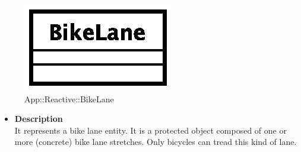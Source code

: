 \begin{figure}[h]
\centering
\includegraphics[scale=0.6,keepaspectratio]{images/solution/bike_lane.eps}
\caption{App::Reactive::BikeLane}
\label{fig:sd-app-bike_lane}
\end{figure}
\FloatBarrier
\begin{itemize}
  \item \textbf{Description} \\
    It represents a bike lane entity. It is a protected object composed of
    one or more (concrete) bike lane stretches. Only bicycles can tread this
    kind of lane. 
\end{itemize}
